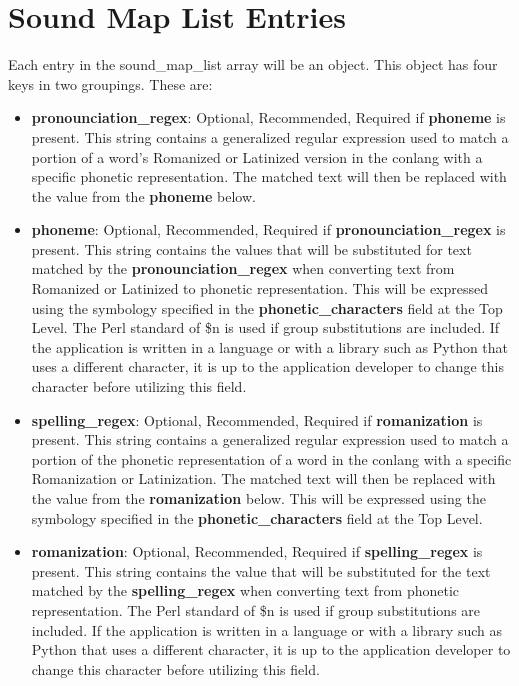 \chapter{Sound Map List Entries}
Each entry in the sound\_map\_list array will be an object.  This object has four keys in two groupings.  These are:
\begin{itemize}
	\item \textbf{pronounciation\_regex}: Optional, Recommended, Required if \textbf{phoneme} is present.  This string contains a generalized regular expression used to match a portion of a word's Romanized or Latinized version in the conlang with a specific phonetic representation.  The matched text will then be replaced with the value from the \textbf{phoneme} below.
	\item \textbf{phoneme}: Optional, Recommended, Required if \textbf{pronounciation\_regex} is present.  This string contains the values that will be substituted for text matched by the \textbf{pronounciation\_regex} when converting text from Romanized or Latinized to phonetic representation.  This will be expressed using the symbology specified in the \textbf{phonetic\_characters} field at the Top Level.  The Perl standard of \$n is used if group substitutions are included.  If the application is written in a language or with a library such as Python that uses a different character, it is up to the application developer to change this character before utilizing this field.
	\item \textbf{spelling\_regex}: Optional, Recommended, Required if \textbf{romanization} is present.  This string contains a generalized regular expression used to match a portion of the phonetic representation of a word in the conlang with a specific Romanization or Latinization.  The matched text will then be replaced with the value from the \textbf{romanization} below.  This will be expressed using the symbology specified in the \textbf{phonetic\_characters} field at the Top Level.
	\item \textbf{romanization}: Optional, Recommended, Required if \textbf{spelling\_regex} is present.  This string contains the value that will be substituted for the text matched by the \textbf{spelling\_regex} when converting text from phonetic representation.  The Perl standard of \$n is used if group substitutions are included.  If the application is written in a language or with a library such as Python that uses a different character, it is up to the application developer to change this character before utilizing this field.
\end{itemize}

